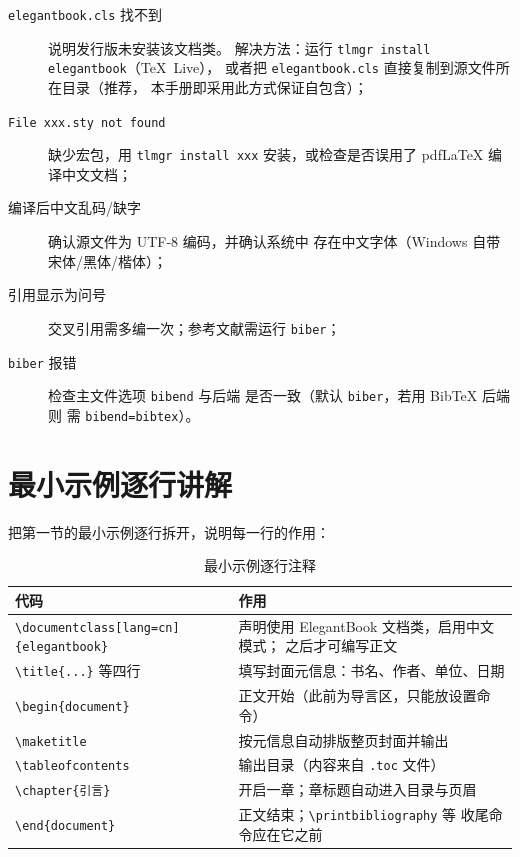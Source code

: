 \begin{description}
  \item[\texttt{elegantbook.cls} 找不到] 说明发行版未安装该文档类。
        解决方法：运行 \texttt{tlmgr install elegantbook}（TeX~Live），
        或者把 \texttt{elegantbook.cls} 直接复制到源文件所在目录（推荐，
        本手册即采用此方式保证自包含）；
  \item[\texttt{File xxx.sty not found}] 缺少宏包，用
        \texttt{tlmgr install xxx} 安装，或检查是否误用了 pdfLaTeX
        编译中文文档；
  \item[编译后中文乱码/缺字] 确认源文件为 UTF-8 编码，并确认系统中
        存在中文字体（Windows 自带宋体/黑体/楷体）；
  \item[引用显示为问号] 交叉引用需多编一次；参考文献需运行
        \texttt{biber}；
  \item[\texttt{biber} 报错] 检查主文件选项 \texttt{bibend} 与后端
        是否一致（默认 \texttt{biber}，若用 BibTeX 后端则
        需 \texttt{bibend=bibtex}）。
\end{description}

\section{最小示例逐行讲解}

把第一节的最小示例逐行拆开，说明每一行的作用：

\begin{table}[htbp]
  \centering
  \caption{最小示例逐行注释}\label{tab:linebyline}
  \begin{tabular}{lp{9.5cm}}
    \toprule
    代码 & 作用 \\
    \midrule
    \texttt{\textbackslash documentclass[lang=cn]\{elegantbook\}}
      & 声明使用 ElegantBook 文档类，启用中文模式；
        之后才可编写正文 \\
    \texttt{\textbackslash title\{...\}} 等四行
      & 填写封面元信息：书名、作者、单位、日期 \\
    \texttt{\textbackslash begin\{document\}}
      & 正文开始（此前为导言区，只能放设置命令）\\
    \texttt{\textbackslash maketitle}
      & 按元信息自动排版整页封面并输出 \\
    \texttt{\textbackslash tableofcontents}
      & 输出目录（内容来自 \texttt{.toc} 文件）\\
    \texttt{\textbackslash chapter\{引言\}}
      & 开启一章；章标题自动进入目录与页眉 \\
    \texttt{\textbackslash end\{document\}}
      & 正文结束；\texttt{\textbackslash printbibliography} 等
        收尾命令应在它之前 \\
    \bottomrule
  \end{tabular}
\end{table}

